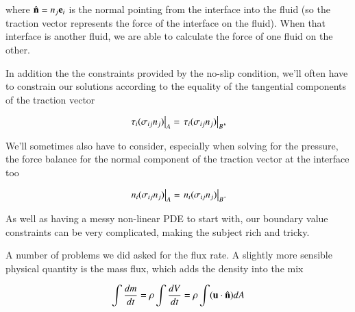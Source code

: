 where $\hat{\mathbf{n}} = n_j \mathbf{e}_i$ is the normal pointing from the interface into the fluid (so the traction vector represents the force of the interface on the fluid).  When that interface is another fluid, we are able to calculate the force of one fluid on the other.

In addition the the constraints provided by the no-slip condition, we'll often have to constrain our solutions according to the equality of the tangential components of the traction vector

\begin{equation}\label{eqn:continuumFluidsReview:1230}
{\left.{\tau_i (\sigma_{ij} n_j)}\right\vert}_{A} =
{\left.{\tau_i (\sigma_{ij} n_j)}\right\vert}_{B},
\end{equation}

We'll sometimes also have to consider, especially when solving for the pressure, the force balance for the normal component of the traction vector at the interface too

\begin{equation}\label{eqn:continuumFluidsReview:1250}
{\left.{n_i (\sigma_{ij} n_j)}\right\vert}_{A} =
{\left.{n_i (\sigma_{ij} n_j)}\right\vert}_{B}.
\end{equation}

As well as having a messy non-linear PDE to start with, our boundary value constraints can be very complicated, making the subject rich and tricky.


A number of problems we did asked for the flux rate.  A slightly more sensible physical quantity is the mass flux, which adds the density into the mix

\begin{equation}\label{eqn:continuumFluidsReview:1450}
\int \frac{dm}{dt} = \rho \int \frac{dV}{dt} = \rho \int (\mathbf{u} \cdot \hat{\mathbf{n}}) dA
\end{equation}

